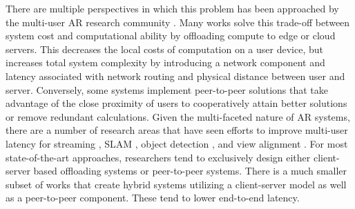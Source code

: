 \documentclass{vgtc}                          %
\begin{document}
There are multiple perspectives in which this problem has been approached by the multi-user AR research community \cite{BreakingEdgeShackles,hambazi,AdaptSLAM,SEESys}.
Many works solve this trade-off between system cost and computational ability by offloading compute to edge or 
cloud servers. This decreases the local  costs of computation on a user device, but increases 
total system complexity by introducing a network component and latency associated with network routing and 
physical distance between user and server. Conversely, some systems implement peer-to-peer solutions that take advantage 
of the close proximity of users to cooperatively attain better solutions or remove redundant calculations.
Given the multi-faceted nature of AR systems, there are a number of research areas that have seen efforts to improve
multi-user latency for streaming \cite{intelli-ar}, SLAM \cite{SLAMShare}, object detection \cite{SEAR}\cite{Nimbus}, 
and view alignment \cite{communication-efficient-spatially-consistent}\cite{ARLight}. For most state-of-the-art approaches, researchers
tend to exclusively design either client-server based offloading systems or peer-to-peer systems. There is a much smaller 
subset of works that create hybrid systems utilizing a client-server model as well as a peer-to-peer component. These 
tend to lower end-to-end latency\cite{SCAXR}\cite{SEAR}. 

\end{document}
